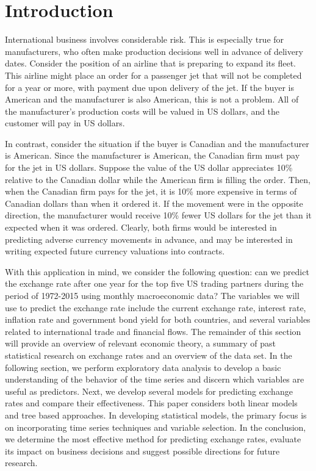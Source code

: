 \documentclass{sig-alternate-05-2015}
\begin{document}
\section{Introduction}
International business involves considerable risk. This is especially true for manufacturers, who often make production decisions well in advance of delivery dates. Consider the position of an airline that is preparing to expand its fleet. This airline might place an order for a passenger jet that will not be completed for a year or more, with payment due upon delivery of the jet. If the buyer is American and the manufacturer is also American, this is not a problem. All of the manufacturer's production costs will be valued in US dollars, and the customer will pay in US dollars.
\par{} In contrast, consider the situation if the buyer is Canadian and the manufacturer is American. Since the manufacturer is American, the Canadian firm must pay for the jet in US dollars. Suppose the value of the US dollar appreciates 10\% relative to the Canadian dollar while the American firm is filling the order. Then, when the Canadian firm pays for the jet, it is 10\% more expensive in terms of Canadian dollars than when it ordered it. If the movement were in the opposite direction, the manufacturer would receive 10\% fewer US dollars for the jet than it expected when it was ordered. Clearly, both firms would be interested in predicting adverse currency movements in advance, and may be interested in writing expected future currency valuations into contracts. 
\par{} With this application in mind, we consider the following question: can we predict the exchange rate after one year for the top five US trading partners during the period of 1972-2015 using monthly macroeconomic data? The variables we will use to predict the exchange rate include the current exchange rate, interest rate, inflation rate and government bond yield for both countries, and several variables related to international trade and financial flows. The remainder of this section will provide an overview of relevant economic theory, a summary of past statistical research on exchange rates and an overview of the data set. In the following section, we perform exploratory data analysis to develop a basic understanding of the behavior of the time series and discern which variables are useful as predictors. Next, we develop several models for predicting exchange rates and compare their effectiveness. This paper considers both linear models and tree based approaches. In developing statistical models, the primary focus is on incorporating time series techniques and variable selection. In the conclusion, we determine the most effective method for predicting exchange rates, evaluate its impact on business decisions and suggest possible directions for future research.
\end{document}
